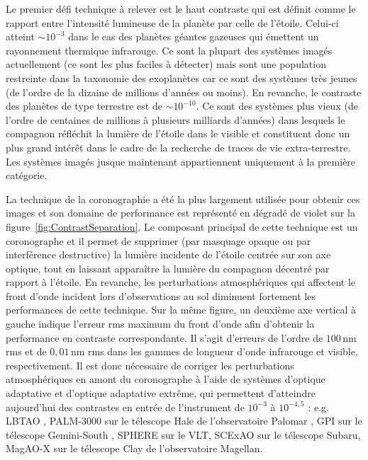 Le premier défi technique à relever est le haut contraste qui est définit comme le rapport entre l'intensité lumineuse de la planète par celle de l'étoile. Celui-ci atteint $\sim 10^{-3}$ dans le cas des planètes géantes gazeuses qui émettent un rayonnement thermique infrarouge. Ce sont la plupart des systèmes imagés actuellement (ce sont les plus faciles à détecter) mais sont une population restreinte dans la taxonomie des exoplanètes car ce sont des systèmes très jeunes (de l'ordre de la dizaine de millions d'années ou moins). En revanche, le contraste des planètes de type terrestre est de $\sim 10^{-10}$. Ce sont des systèmes plus vieux (de l'ordre de centaines de millions à plusieurs milliards d'années) dans lesquels le compagnon réfléchit la lumière de l'étoile dans le visible et constituent donc un plus grand intérêt dans le cadre de la recherche de traces de vie extra-terrestre. Les systèmes imagés jusque maintenant appartiennent uniquement à la première catégorie.

La technique de la coronographie \citep{lyot1939} a été la plus largement utilisée pour obtenir ces images et son domaine de performance est représenté en dégradé de violet sur la figure~\ref{fig:ContrastSeparation}. Le composant principal de cette technique est un coronographe et il permet de supprimer (par masquage opaque ou par interférence destructive) la lumière incidente de l'étoile centrée sur son axe optique, tout en laissant apparaître la lumière du compagnon décentré par rapport à l'étoile. En revanche, les perturbations atmosphériques qui affectent le front d'onde incident lors d'observations au sol diminuent fortement les performances de cette technique. Sur la même figure, un deuxième axe vertical à gauche indique l'erreur rms maximum du front d'onde afin d'obtenir la performance en contraste correspondante. Il s'agit d'erreurs de l'ordre de $100 \,$nm rms et de $0,01 \,$nm rms dans les gammes de longueur d'onde infrarouge et visible, respectivement. Il est donc nécessaire de corriger les perturbations atmosphériques en amont du coronographe \citep{sivaramakrishnan2001} à l'aide de systèmes d'optique adaptative \citep{rousset1990} et d'optique adaptative extrême, qui permettent d'atteindre aujourd'hui des contrastes en entrée de l'instrument de $10^{-3}$ à $10^{-4,5}$ : e.g. \ac{LBTAO} \citep{esposito2011}, PALM-3000 sur le télescope Hale de l'observatoire Palomar \citep{dekany2013}, \ac{GPI} sur le télescope Gemini-South \citep{macintosh2014}, \ac{SPHERE} \citep{beuzit2019} sur le \ac{VLT}, \ac{SCExAO} \citep{jovanovic2015} sur le télescope Subaru, \ac{MagAO-X} \citep{males2020} sur le télescope Clay de l'observatoire Magellan.

